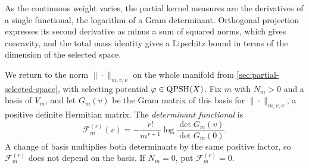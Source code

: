 As the continuous weight varies, the partial kernel measures are the derivatives of a single functional, the logarithm of a Gram determinant. Orthogonal projection expresses its second derivative as minus a sum of squared norms, which gives concavity, and the total mass identity gives a Lipschitz bound in terms of the dimension of the selected space.

We return to the norm $\|\cdot\|_{m,v,\nu}$ on the whole manifold from \cref{sec:partial-selected-space}, with selecting potential $\varphi\in\mathrm{QPSH}(X)$. Fix $m$ with $N_m>0$ and a basis of $V_m$, and let $G_m(v)$ be the Gram matrix of this basis for $\|\cdot\|_{m,v,\nu}$, a positive definite Hermitian matrix. The \emph{determinant functional} is
\[
 \mathcal F_m^{(r)}(v)
 =-\frac{r!}{m^{r+1}}
       \log\frac{\det G_m(v)}{\det G_m(0)}.
\]
A change of basis multiplies both determinants by the same positive factor, so $\mathcal F_m^{(r)}$ does not depend on the basis. If $N_m=0$, put $\mathcal F_m^{(r)}=0$.

